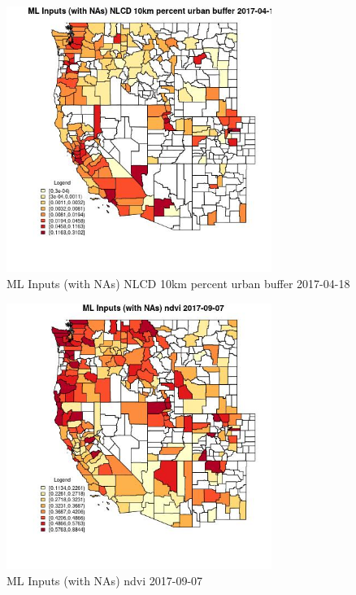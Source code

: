 \begin{figure} 
\centering  
\includegraphics[width=0.77\textwidth]{Code_Outputs/Report_ML_input_PM25_Step4_part_e_de_duplicated_aves_compiled_2019-05-20wNAs_CountyNLCD_10km_percent_urban_bufferMean2017-04-18.jpg} 
\caption{\label{fig:Report_ML_input_PM25_Step4_part_e_de_duplicated_aves_compiled_2019-05-20wNAsCountyNLCD_10km_percent_urban_bufferMean2017-04-18}ML Inputs (with NAs) NLCD 10km percent urban buffer 2017-04-18} 
\end{figure} 
 

\begin{figure} 
\centering  
\includegraphics[width=0.77\textwidth]{Code_Outputs/Report_ML_input_PM25_Step4_part_e_de_duplicated_aves_compiled_2019-05-20wNAs_CountyndviMean2017-09-07.jpg} 
\caption{\label{fig:Report_ML_input_PM25_Step4_part_e_de_duplicated_aves_compiled_2019-05-20wNAsCountyndviMean2017-09-07}ML Inputs (with NAs) ndvi 2017-09-07} 
\end{figure} 
 

